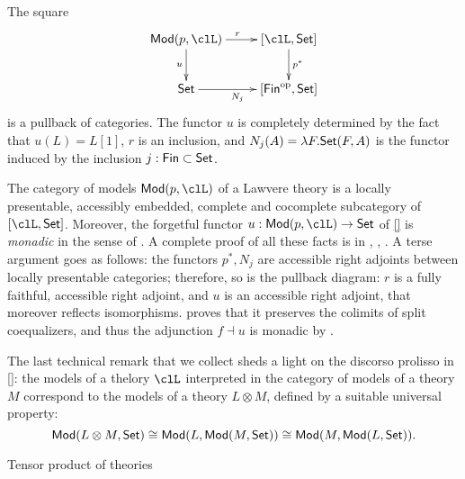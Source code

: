 \begin{corollary}
  The square 
  \[
  \xymatrix{
    \cate{Mod}(p,\clL) \ar[d]_u \ar[r]^r & [\clL,\Set]\ar[d]^{p^*} \\ 
    \Set \ar[r]_{N_j} & [\cate{Fin}^\op,\Set]
  }  
  \]
  is a pullback of categories. The functor $u$ is completely determined by the fact that $u(L) = L[1]$, $r$ is an inclusion, and $N_j(A) = \lambda F.\mathsf{Set}(F,A)$ is the functor induced by the inclusion $j : \mathsf{Fin} \subset \mathsf{Set}$.
\end{corollary}
\begin{corollary}
  The category of models $\cate{Mod}(p,\clL)$ of a Lawvere theory is a locally presentable, accessibly embedded, complete and cocomplete subcategory of $[\clL,\Set]$. Moreover, the forgetful functor $u : \cate{Mod}(p,\clL) \to \Set$ of \ref{} is \emph{monadic} in the sense of \cite[]{}. A complete proof of all these facts is in \cite[]{}, \cite[]{}, \cite[]{}. A terse argument goes as follows: the functors $p^*, N_j$ are accessible right adjoints between locally presentable categories; therefore, so is the pullback diagram: $r$ is a fully faithful, accessible right adjoint, and $u$ is an accessible right adjoint, that moreover reflects isomorphisms. \cite[]{} proves that it preserves the colimits of split coequalizers, and thus the adjunction $f \dashv u$ is monadic by \cite[]{}.
\end{corollary}
The last technical remark that we collect sheds a light on the discorso prolisso in \ref{}: the models of a thelory $\clL$ interpreted in the category of models of a theory $M$ correspond to the models of a theory $L \otimes M$, defined by a suitable universal property: 
\[
\mathsf{Mod}(L\otimes M,\mathsf{Set})  \cong
\mathsf{Mod}(L, \mathsf{Mod}(M,\mathsf{Set}))  \cong
\mathsf{Mod}(M, \mathsf{Mod}(L,\mathsf{Set})).
\]
\begin{definition}
  Tensor product of theories
\end{definition}
